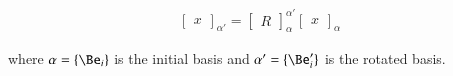 \documentclass{article}
\newcommand{\Lor}[2]{{{\Lambda^{#1}}_{#2}}}
\begin{document}
\begin{align*}
{
\begin{bmatrix}
x
\end{bmatrix}
}_{\alpha'}
=
{
\begin{bmatrix}
R
\end{bmatrix}
}_{\alpha}^{\alpha'}
{
\begin{bmatrix}
x
\end{bmatrix}
}_{\alpha}
\end{align*}

where ${\alpha} = \{\Be_i\}$ is the initial basis
and ${\alpha}' = \{\Be_i'\}$ is the rotated basis.

\end{document}
